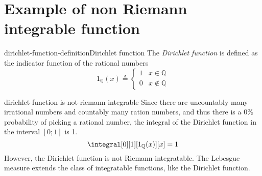 \documentclass[preview]{standalone}
\begin{document}
\genpage


\section{Example of non Riemann integrable function}

\begin{snippetdefinition}{dirichlet-function-definition}{Dirichlet function}
    The \textit{Dirichlet function} is defined as the indicator function of the rational numbers
    \[
        1_{\mathbb{Q}}(x) \triangleq \begin{cases}
            1 & x \in \mathbb{Q} \\
            0 & x \notin \mathbb{Q}
        \end{cases}
    \]
\end{snippetdefinition}

\begin{snippet}{dirichlet-function-is-not-riemann-integrable}
    Since there are uncountably many irrational numbers and countably many ration numbers,
    and thus there is a 0\% probability of picking a rational number, the integral
    of the Dirichlet function in the interval \([0; 1]\) is 1.
    \[
        \integral[0][1][1_{\mathbb{Q}}(x)][x] = 1
    \]
    However, the Dirichlet function is not Riemann integratable.
    The Lebesgue measure extends the class of integratable functions, like the Dirichlet function.
\end{snippet}
\end{document}
